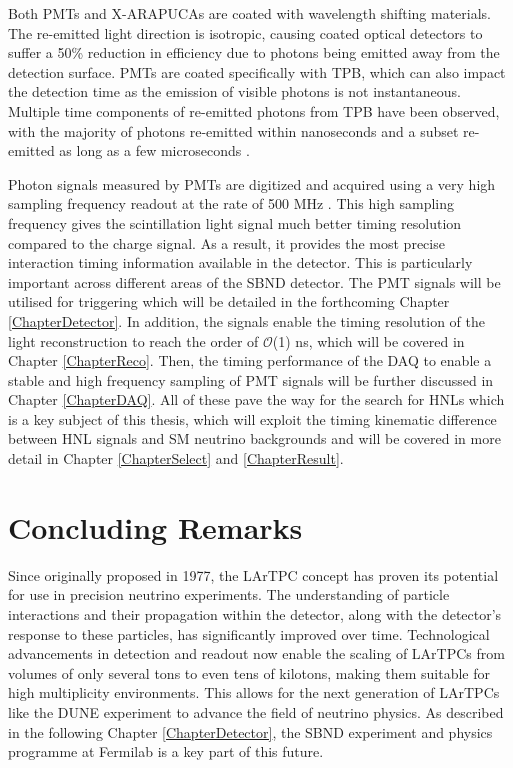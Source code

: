 Both PMTs and X-ARAPUCAs are coated with wavelength shifting materials.
The re-emitted light direction is isotropic, causing coated optical detectors to suffer a 50\% reduction in efficiency due to photons being emitted away from the detection surface.
PMTs are coated specifically with TPB, which can also impact the detection time as the emission of visible photons is not instantaneous.
Multiple time components of re-emitted photons from TPB have been observed, with the majority of photons re-emitted within nanoseconds and a subset re-emitted as long as a few microseconds \cite{tpb_time}.

Photon signals measured by PMTs are digitized and acquired using a very high sampling frequency readout at the rate of 500 MHz \cite{sbnd_det}.
This high sampling frequency gives the scintillation light signal much better timing resolution compared to the charge signal.
As a result, it provides the most precise interaction timing information available in the detector.
This is particularly important across different areas of the SBND detector.
The PMT signals will be utilised for triggering which will be detailed in the forthcoming Chapter \ref{ChapterDetector}.
In addition, the signals enable the timing resolution of the light reconstruction to reach the order of $\mathcal{O}$(1) ns, which will be covered in Chapter \ref{ChapterReco}.
Then, the timing performance of the DAQ to enable a stable and high frequency sampling of PMT signals will be further discussed in Chapter \ref{ChapterDAQ}.
All of these pave the way for the search for HNLs which is a key subject of this thesis, which will exploit the timing kinematic difference between HNL signals and SM neutrino backgrounds and will be covered in more detail in Chapter \ref{ChapterSelect} and \ref{ChapterResult}.

\section{Concluding Remarks}
\label{lartpcConclude}
Since originally proposed in 1977, the LArTPC concept has proven its potential for use in precision neutrino experiments.
The understanding of particle interactions and their propagation within the detector, along with the detector's response to these particles, has significantly improved over time. 
Technological advancements in detection and readout now enable the scaling of LArTPCs from volumes of only several tons to even tens of kilotons, making them suitable for high multiplicity environments.
This allows for the next generation of LArTPCs like the DUNE experiment to advance the field of neutrino physics.
As described in the following Chapter \ref{ChapterDetector}, the SBND experiment and physics programme at Fermilab is a key part of this future.

